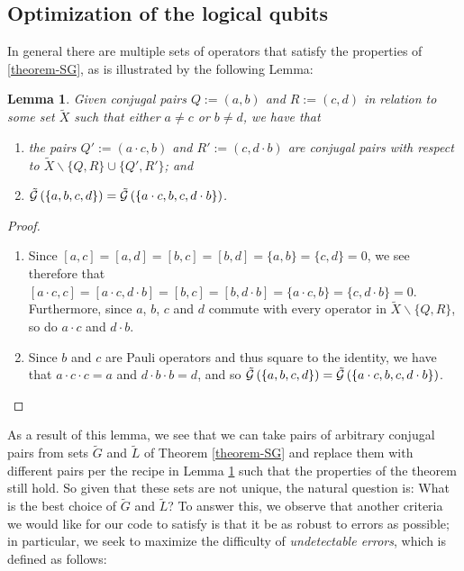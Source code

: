 \documentclass[twocolumn,showpacs,preprintnumbers,amsmath,amssymb,nofootinbib,pra,floatfix]{revtex4-1}
\newtheorem{lemma}{Lemma}
\newcommand{\set}{\tilde}
\newcommand{\genfun}{\tilde{\mathcal{G}}}
\begin{document}
\subsection{Optimization of the logical qubits}

In general there are multiple sets of operators that satisfy the properties of \ref{theorem-SG}, as is illustrated by the following Lemma:

\begin{lemma}
\label{combining-pairs}
Given conjugal pairs $Q:=(a,b)$ and $R:=(c,d)$ in relation to some set $\set X$ such that either $a\ne c$ or $b\ne d$, we have that
\begin{enumerate}
\item the pairs $Q':=(a\cdot c,b)$ and $R':=(c,d\cdot b)$ are conjugal pairs with respect to $\set X \backslash \{Q,R\} \cup \{Q',R'\}$; and
\item $\genfun\paren{\{a,b,c,d\}}=\genfun\paren{\{a\cdot c,b,c,d\cdot b\}}$.
\end{enumerate}
\end{lemma}

\begin{proof}
\begin{enumerate}
\item Since $[a,c]=[a,d]=[b,c]=[b,d]=\{a,b\}=\{c,d\}=0$, we see therefore that $[a\cdot c,c]=[a\cdot c,d\cdot b]=[b,c]=[b,d\cdot b]=\{a\cdot c,b\}=\{c,d\cdot b\}=0$.  Furthermore, since $a$, $b$, $c$ and $d$ commute with every operator in $\set X\backslash \{Q,R\}$, so do $a\cdot c$ and $d\cdot b$.
\item Since $b$ and $c$ are Pauli operators and thus square to the identity, we have that $a\cdot c\cdot c=a$ and $d\cdot b\cdot b=d$, and so $\genfun\paren{\{a,b,c,d\}}=\genfun\paren{\{a\cdot c,b,c,d\cdot b\}}$.
\end{enumerate}
\end{proof}
As a result of this lemma, we see that we can take pairs of arbitrary conjugal pairs from sets $\set G$ and $\set L$ of Theorem \ref{theorem-SG} and replace them with different pairs per the recipe in Lemma \ref{combining-pairs} such that the properties of the theorem still hold.  So given that these sets are not unique, the natural question is:  What is the best choice of $\set G$ and $\set L$?  To answer this, we observe that another criteria we would like for our code to satisfy is that it be as robust to errors as possible;  in particular, we seek to maximize the difficulty of \emph{undetectable errors}, which is defined as follows:
\end{document}
